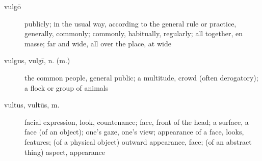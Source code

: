 \begin{description}
    \item[vulgō] \marginnote{*}publicly; in the usual way, according to the general rule or practice, generally, commonly; commonly, habitually, regularly; all together, en masse; far and wide, all over the place, at wide
    \item[vulgus, vulgī, n. (m.)] \marginnote{*}the common people, general public; a multitude, crowd (often derogatory); a flock or group of animals
    \item[vultus, vultūs, m.] \marginnote{*}facial expression, look, countenance; face, front of the head; a surface, a face (of an object); one's gaze, one's view; appearance of a face, looks, features; (of a physical object) outward appearance, face; (of an abstract thing) aspect, appearance
\end{description}
